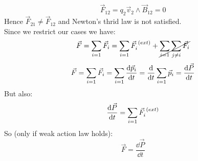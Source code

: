 \begin{equation}
    \vec{F}_{12} = q_2\vec{v}_2\wedge\vec{B}_{12} = 0
\end{equation}
Hence $\vec{F}_{21} \neq \vec{F}_{12}$ and Newton's thrid law is not satisfied.\\
Since we restrict our cases we have:
\begin{equation}
    \vec{F} = \displaystyle\sum_{i=1}\vec{F}_i = \displaystyle\sum_{i=1}\vec{F}_i^{\;(ext)} + \cancel{\displaystyle\sum_{i=1}\displaystyle\sum_{j\neq i}\vec{F}_i}
\end{equation}
\begin{equation}
    \vec{F} = \displaystyle\sum_{i=1}\vec{F}_i = \displaystyle\sum_{i=1}\dfrac{\dd{\vec{p}_i}}{\dd{t}} = \dfrac{\dd{}}{\dd{t}}\displaystyle\sum_{i=1}\vec{p}_i = \dfrac{\dd{\vec{P}}}{\dd{t}}
\end{equation}
But also:
\begin{equation}
    \dfrac{\dd{\vec{P}}}{\dd{t}} = \displaystyle\sum_{i=1}\vec{F}_i^{\;(ext)}
\end{equation}
So (only if weak action law holds):
\begin{equation}
    \vec{F} = \dfrac{\dd{\vec{P}}}{\dd{t}}
\end{equation}

